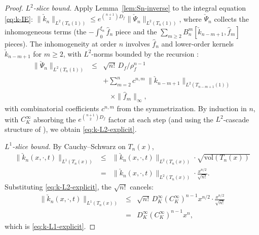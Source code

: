 \documentclass[journal,twoside,web]{ieeecolor}
\begin{document}
\begin{proof}
\emph{$L^2$-slice bound.} Apply Lemma~\ref{lem:Sn-inverse} to the integral equation \eqref{eq:k-IE}: $\|\check k_n\|_{L^2(T_n(1))}\le e^{\binom{n+1}{2}D_f}\|\check\Psi_n\|_{L^2(T_n(1))}$, where $\check\Psi_n$ collects the inhomogeneous terms (the $-\int_0^{\xi_n}\hat f_n$ piece and the $\sum_{m\ge 2}B^m_n[\check k_{n-m+1},\hat f_m]$ pieces). The inhomogeneity at order $n$ involves $\hat f_n$ and lower-order kernels $\check k_{n-m+1}$ for $m\ge 2$, with $L^2$-norms bounded by the recursion \cite[eq.~(8) and proof of Theorem~1]{HV1}:
\begin{eqnarray}
\|\check\Psi_n\|_{L^2(T_n(1))} &\le& \sqrt{n!}\,D_f/\rho_f^{n-1} \nonumber\\
&& +\sum_{m=2}^n c^{n,m}\,\|\check k_{n-m+1}\|_{L^2(T_{n-m+1}(1))} \nonumber\\
&& \quad\times\|\hat f_m\|_\infty, \label{eq:Psi-L2-bound}
\end{eqnarray}
with combinatorial coefficients $c^{n,m}$ from the symmetrization. By induction in $n$, with $C_K^\infty$ absorbing the $e^{\binom{n+1}{2}D_f}$ factor at each step (and using the $L^2$-cascade structure of \cite{HV1}), we obtain \eqref{eq:k-L2-explicit}.

\emph{$L^1$-slice bound.} By Cauchy--Schwarz on $T_n(x)$,
\begin{eqnarray}
\|\check k_n(x,\cdot,t)\|_{L^1(T_n(x))} &\le& \|\check k_n(x,\cdot,t)\|_{L^2(T_n(x))}\cdot\sqrt{\mathrm{vol}(T_n(x))} \nonumber\\
&=& \|\check k_n(x,\cdot,t)\|_{L^2(T_n(x))}\cdot\frac{x^{n/2}}{\sqrt{n!}}. \label{eq:HV2-bridge}
\end{eqnarray}
Substituting \eqref{eq:k-L2-explicit}, the $\sqrt{n!}$ cancels:
\begin{eqnarray}
\|\check k_n(x,\cdot,t)\|_{L^1(T_n(x))} &\le& \sqrt{n!}\,D_K^\infty(C_K^\infty)^{n-1}x^{n/2}\cdot\frac{x^{n/2}}{\sqrt{n!}} \nonumber\\
&=& D_K^\infty(C_K^\infty)^{n-1}x^n, \label{eq:k-L1-derivation}
\end{eqnarray}
which is \eqref{eq:k-L1-explicit}.
\end{proof}
\end{document}
